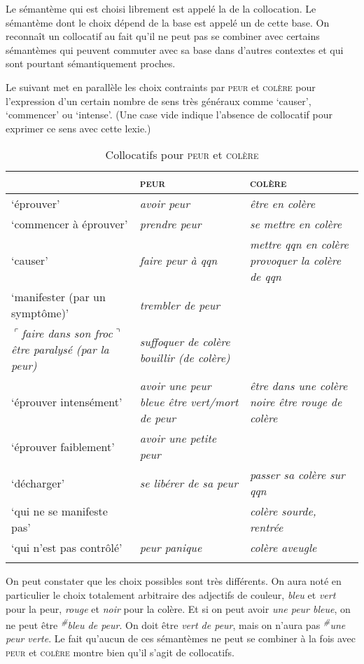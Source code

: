 {Le sémantème qui est choisi librement est appelé la  de la collocation. Le sémantème dont le choix dépend de la base est appelé un  de cette base. On reconnaît un collocatif au fait qu’il ne peut pas se combiner avec certains sémantèmes qui peuvent commuter avec sa base dans d’autres contextes et qui sont pourtant sémantiquement proches.}

Le  suivant met en parallèle les choix contraints par \textsc{peur} et \textsc{colère} pour l’expression d’un certain nombre de sens très généraux comme ‘causer’, ‘commencer’ ou ‘intense’. (Une case vide indique l’absence de collocatif pour exprimer ce sens avec cette lexie.)

\begin{table}
\caption{Collocatifs pour \textsc{peur} et \textsc{colère}\label{tab:2-3:1}}
\begin{tabularx}{\textwidth}{QQQ}
\lsptoprule
 & {\scshape peur} & {\scshape colère}\\
 \midrule
‘éprouver’ & {\itshape avoir peur} & {\itshape être en colère}\\
‘commencer à éprouver’ & {\itshape prendre peur} & {\itshape se mettre en colère}\\
‘causer’ & {\itshape faire peur à qqn} & {\itshape mettre qqn en colère} {\itshape provoquer la colère de qqn}\\
‘manifester (par un symptôme)’ & \textit{trembler de peur}\\
$⌜$\textit{faire dans son froc}$⌝$ {\itshape être paralysé (par la peur)} & {\itshape suffoquer de colère bouillir (de colère)}\\
‘éprouver intensément’ & {\itshape avoir une peur bleue être vert/mort de peur} & {\itshape être dans une colère noire être rouge de colère}\\
‘éprouver faiblement’ & {\itshape avoir une petite peur} & \\
‘décharger’ & {\itshape se libérer de sa peur} & {\itshape passer sa colère sur qqn}\\
‘qui ne se manifeste pas’ &  & {\itshape colère sourde, rentrée}\\
‘qui n’est pas contrôlé’ & {\itshape peur panique} & {\itshape colère aveugle}\\
\lspbottomrule
\end{tabularx}
\end{table}

On peut constater que les choix possibles sont très différents. On aura noté en particulier le choix totalement arbitraire des adjectifs de couleur, \textit{bleu} et \textit{vert} pour la peur, \textit{rouge} et \textit{noir} pour la colère. Et si on peut avoir \textit{une peur bleue}, on ne peut être \textit{\textsuperscript{\#}}\textit{bleu de peur}. On doit être \textit{vert de peur}, mais on n’aura pas \textit{\textsuperscript{\#}}\textit{une peur verte}. Le fait qu’aucun de ces sémantèmes ne peut se combiner à la fois avec \textsc{peur} et \textsc{colère} montre bien qu’il s’agit de collocatifs.

